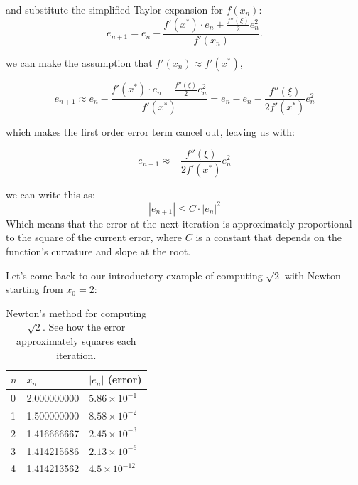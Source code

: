 and substitute the simplified Taylor expansion for $f(x_n)$:
\begin{equation}
    e_{n+1} = e_n - \frac{f'(x^*) \cdot e_n + \frac{f''(\xi)}{2} e_n^2}{f'(x_n)}.
\end{equation}

  we can make the assumption that $f'(x_n) \approx f'(x^*)$,



\begin{equation}
    e_{n+1} \approx e_n - \frac{f'(x^*) \cdot e_n + \frac{f''(\xi)}{2} e_n^2}{f'(x^*)} = e_n - e_n - \frac{f''(\xi)}{2f'(x^*)} e_n^2
\end{equation}

which makes the first order error term cancel out, leaving us with:

\begin{equation}
    e_{n+1} \approx -\frac{f''(\xi)}{2f'(x^*)} e_n^2
\end{equation}

 we can write this as:
\begin{equation}
    |e_{n+1}| \leq C \cdot |e_n|^2
\end{equation}
Which means that the error at the next iteration is approximately proportional to the square of the current error, where $C$ is a constant that depends on the function's curvature and slope at the root.


\vspace{1.5em}
Let's come back to our introductory example of computing $\sqrt{2}$ with Newton starting from $x_0 = 2$:

\begin{table}[h]
\centering
\begin{tabular}{p{}p{}p{}}
\toprule
\textbf{$n$} & \textbf{$x_n$} & \textbf{$|e_n|$ (error)} \\
\midrule
0 & 2.000000000 & $5.86 \times 10^{-1}$ \\
1 & 1.500000000 & $8.58 \times 10^{-2}$ \\
2 & 1.416666667 & $2.45 \times 10^{-3}$ \\
3 & 1.414215686 & $2.13 \times 10^{-6}$ \\
4 & 1.414213562 & $4.5 \times 10^{-12}$ \\
\bottomrule
\end{tabular}
\vspace{2em}
\caption{Newton's method for computing $\sqrt{2}$. See how the error approximately squares each iteration.}
\label{tab:newton_sqrt2}
\end{table}



